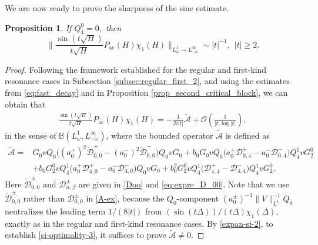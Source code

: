\documentclass[reqno]{amsart}
\newtheorem{proposition}[theorem]{Proposition}
\numberwithin{equation}{section}
\begin{document}
We are now ready to prove the sharpness of the sine estimate. 
\begin{proposition}\label{sine-sharp-2}
	If $Q_4^0= 0,$  then
\begin{equation}
\label{si-optimality-3}
	\Big\|\frac{\sin (t \sqrt{H})}{t\sqrt{H}} P_{\mathrm{ac}}(H)\chi_1(H)\Big\|_{L^1_\omega \to L^{\infty}_{-\omega}} \sim |t|^{-1},\ \ |t|\ge 2.
\end{equation}  
\end{proposition}
\begin{proof}
Following the framework established for the regular and first-kind resonance cases in Subsection \ref{subsec:regular_first_2}, and using the estimates from \eqref{eq:fast_decay} and in Proposition \ref{prop_second_critical_block}, we can obtain that 
\begin{align}\label {expan-si-2} 
\frac{\sin(t\sqrt{H})}{t\sqrt{H}} P_{\mathrm{ac}}(H)\chi_1(H)    
= -\frac{1}{2 i |t|}\widetilde{\mathcal{A}} + \mathcal{O}\!\left(\frac{1}{|t|\log |t|}\right),   
\end{align} 
in the sense of $\mathbb{B}(L^1_\omega, L^\infty_{-\omega})$, where the bounded  operator $\widetilde{\mathcal{A}}$ is defined as 
	\begin{equation}  \label{A-ex}  
    \begin{split}
		\widetilde{\mathcal{A}} = &G_0 vQ_0 \bigl((a_0^+)^2 \widetilde{\mathcal{D}}_{0,0}^{+}-(a_0^-)^2 \widetilde{\mathcal{D}}_{0,0}^{-} \bigr)Q_0v G_0  + b_0  G_0 v Q_0 \bigl(a_0^+\mathcal{D}_{0,4}^{+}-a_0^-\mathcal{D}_{0,4}^{-} \bigr) Q_{4}^1 v G_2^0 \\  
		& + b_0  G_2^0 v Q_{4}^1 \bigl(a_0^+\mathcal{D}_{4,0}^{+}-a_0^-\mathcal{D}_{4,0}^{-}\bigr) Q_{0} v G_0 + b_0^2 G_2^0 v Q_{4}^1 \bigl( \mathcal{D}_{4,4}^{+} - \mathcal{D}_{4,4}^{-} \bigr) Q_{4}^1 v G_2^0.
        \end{split}
	\end{equation}  
Here $\widetilde{\mathcal{D}}_{0,0}^{\pm}$ and $\mathcal{D}_{\alpha,\beta}^{\pm}$ are given in \eqref{Doo} and \eqref{eq:expre_D_00}. Note that we use $\widetilde{\mathcal{D}}_{0,0}^{\pm}$ rather than $\mathcal{D}_{0,0}^{\pm}$  in \eqref{A-ex}, because the $Q_0$-component $(a_0^\pm)^{-1} \|V\|_{L^1}^{-1} Q_0$ neutralizes the leading term ${1}/{(8|t|)}$ from $(\sin(t\Delta))/({t\Delta})\chi_1(\Delta)$, exactly as in the regular and first-kind resonance cases.   
By \eqref{expan-si-2}, to establish \eqref{si-optimality-3}, it suffices to prove   $\widetilde{\mathcal{A}} \neq 0$. 


\end{proof}
\end{document}
